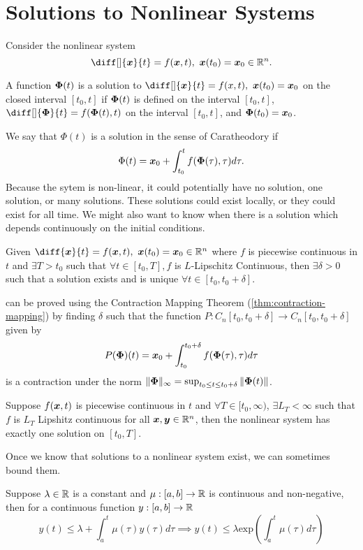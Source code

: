 \section{Solutions to Nonlinear Systems}
Consider the nonlinear system \[
	\diff[]{\bs{x}}{t} = f(\bs{x}, t),\ \bs{x}(t_0) = \bs{x}_0\in \R^n.
\]
\begin{definition}
	A function $\boldsymbol{\Phi}(t)$ is a solution to $\diff[]{\bs{x}}{t} = f(x, t),\
	\bs{x}(t_0) = \bs{x}_0$ on the closed interval $[t_0, t]$ if $\boldsymbol{\Phi}(t)$
	is defined on the interval $[t_0, t]$, $\diff[]{\bs{\Phi}}{t} =
	f(\bs{\Phi}(t), t)$ on the interval $[t_0, t]$, and $\boldsymbol{\Phi}(t_0) =
	\boldsymbol{x}_0$.
	\label{defn:nonlinear-solution}
\end{definition}
We say that $\Phi(t)$ is a solution in the sense of Caratheodory if \[
	\Phi(t) = \boldsymbol{x}_0 + \int_{t_0}^t f(\boldsymbol{\Phi}(\tau), \tau)d\tau.
\]
Because the sytem is non-linear, it could potentially have no solution, one
solution, or many solutions. These solutions could exist locally, or they could
exist for all time. We might also want to know when there is a solution which
depends continuously on the initial conditions.
\begin{theorem}
	Given $\diff{\bs{x}}{t} = f(\bs{x}, t),\ \bs{x}(t_0) = \bs{x}_0\in\R^n$ where
	$f$ is piecewise continuous in $t$ and $\exists T>t_0$ such that $\forall t\in
	[t_0, T], f$ is $L$-Lipschitz Continuous, then $\exists \delta > 0$ such that a
	solution exists and is unique $\forall t\in [t_0, t_0 + \delta]$.
	\label{thm:local-existence}
\end{theorem}
 can be proved using the Contraction Mapping Theorem
(\cref{thm:contraction-mapping}) by finding $\delta$ such that the function
$P:C_n[t_0, t_0+\delta] \to C_n[t_0, t_0+\delta]$ given by \[
	P(\boldsymbol{\Phi})(t) = \boldsymbol{x}_0 + \int_{t_0}^{t_0+\delta} f(\boldsymbol{\Phi}(\tau),
	\tau)d\tau
\]
is a contraction under the norm $\|\boldsymbol{\Phi}\|_\infty = \sup_{t_0\leq t \leq
t_0+\delta} \|\boldsymbol{\Phi}(t)\|$.
\begin{theorem}
	Suppose $f(\boldsymbol{x}, t)$ is piecewise continuous in $t$ and $\forall T\in [t_0,
	\infty)$, $\exists L_T < \infty$ such that $f$ is $L_T$ Lipshitz continuous
	for all $\boldsymbol{x}, \boldsymbol{y} \in \mathbb{R}^n$, then the nonlinear system  has exactly one
	solution on $[t_0, T]$.
	\label{thm:global-existence}
\end{theorem}
Once we know that solutions to a nonlinear system exist, we can sometimes bound
them.
\begin{theorem}
	Suppose $\lambda\in\mathbb{R}$ is a constant and $\mu:[a,b]\to\mathbb{R}$ is continuous and
	non-negative, then for a continuous function $y:[a, b]\to\mathbb{R}$ \[
		y(t) \leq \lambda + \int_a^t \mu(\tau)y(\tau)d\tau \implies y(t) \leq
		\lambda \text{exp}\left(\int_a^t\mu(\tau)d\tau\right)
	\]
	\label{thm:bellman-gronwall}
\end{theorem}
